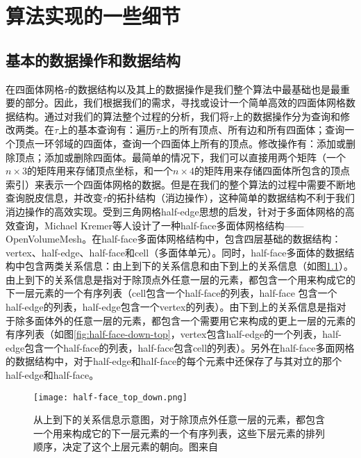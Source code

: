 \chapter{算法实现的一些细节}

\section{基本的数据操作和数据结构}
在四面体网格$\tau$的数据结构以及其上的数据操作是我们整个算法中最基础也是最重要的部分。因此，我们根据我们的需求，寻找或设计一个简单高效的四面体网格数据结构。通过对我们的算法整个过程的分析，我们将$\tau$上的数据操作分为查询和修改两类。在$\tau$上的基本查询有：遍历$\tau$上的所有顶点、所有边和所有四面体；查询一个顶点一环邻域的四面体，查询一个四面体上所有的顶点。修改操作有：添加或删除顶点；添加或删除四面体。最简单的情况下，我们可以直接用两个矩阵（一个$n \times 3$的矩阵用来存储顶点坐标，和一个$n \times 4$的矩阵用来存储四面体所包含的顶点索引）来表示一个四面体网格的数据。但是在我们的整个算法的过程中需要不断地查询脱皮信息，并改变$\tau$的拓扑结构（消边操作），这种简单的数据结构不利于我们消边操作的高效实现。受到三角网格half-edge思想的启发，针对于多面体网格的高效查询，Michael Kremer等人设计了一种half-face多面体网格结构——OpenVolumeMesh\cite{open-volume-mesh}。在half-face多面体网格结构中，包含四层基础的数据结构：vertex、half-edge、half-face和cell（多面体单元）。同时，half-face多面体的数据结构中包含两类关系信息：由上到下的关系信息和由下到上的关系信息（如图\ref{fig:half-face-top-down}）。由上到下的关系信息是指对于除顶点外任意一层的元素，都包含一个用来构成它的下一层元素的一个有序列表（cell包含一个half-face的列表，half-face 包含一个half-edge的列表，half-edge包含一个vertex的列表）。由下到上的关系信息是指对于除多面体外的任意一层的元素，都包含一个需要用它来构成的更上一层的元素的有序列表（如图\ref{fig:half-face-down-top}，vertex包含half-edge的一个列表，half-edge包含一个half-face的列表，half-face包含cell的列表）。另外在half-face多面网格的数据结构中，对于half-edge和half-face的每个元素中还保存了与其对立的那个half-edge和half-face。\par
\begin{figure}[htbp]
    \centering
    \texttt{[image: half-face\_top\_down.png]}
    \caption{从上到下的关系信息示意图，对于除顶点外任意一层的元素，都包含一个用来构成它的下一层元素的一个有序列表，这些下层元素的排列顺序，决定了这个上层元素的朝向。图来自\cite{open-volume-mesh}}
    \label{fig:half-face-top-down}
\end{figure}

